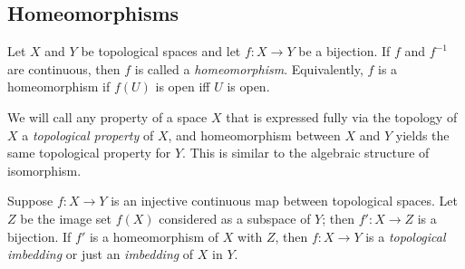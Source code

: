 \documentclass[10pt]{report}
\begin{document}
\subsection{Homeomorphisms}
\begin{definition}
  Let $X$ and $Y$ be topological spaces and let $f:X \rightarrow Y$ be a bijection.
  If $f$ and $f^{-1}$ are continuous, then $f$ is called a \emph{homeomorphism}.
  Equivalently, $f$ is a homeomorphism if $f(U)$ is open iff $U$ is open.
\end{definition}

We will call any property of a space $X$ that is expressed fully via the topology of $X$ a \emph{topological property} of $X$, and homeomorphism between $X$ and $Y$ yields the same topological property for $Y$.
This is similar to the algebraic structure of isomorphism.

Suppose $f:X \rightarrow Y$ is an injective continuous map between topological spaces.
Let $Z$ be the image set $f(X)$ considered as a subspace of $Y$; then $f':X \rightarrow Z$ is a bijection.
If $f'$ is a homeomorphism of $X$ with $Z$, then $f:X \rightarrow Y$ is a \emph{topological imbedding} or just an \emph{imbedding} of $X$ in $Y$.
\end{document}
